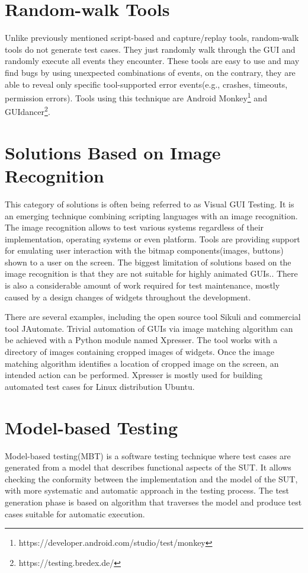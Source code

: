 \section{Random-walk Tools}
Unlike previously mentioned script-based and capture/replay tools, random-walk tools do not generate test cases. They just randomly walk through the GUI and randomly execute all events they encounter. These tools are easy to use and may find bugs by using unexpected combinations of events, on the contrary, they are able to reveal only specific tool-supported error events(e.g., crashes, timeouts, permission errors). Tools using this technique are Android Monkey\footnote{https://developer.android.com/studio/test/monkey} and GUIdancer\footnote{https://testing.bredex.de/}.

\section{Solutions Based on Image Recognition}
This category of solutions is often being referred to as Visual GUI Testing. It is an emerging technique combining scripting languages with an image recognition. The image recognition allows to test various systems regardless of their implementation, operating systems or even platform. Tools are providing support for emulating user interaction with the bitmap components(images, buttons) shown to a user on the screen. The biggest limitation of solutions based on the image recognition is that they are not suitable for highly animated GUIs.\cite{guitesting}. There is also a considerable amount of work required for test maintenance, mostly caused by a design changes of widgets throughout the development.   

There are several examples, including the open source tool Sikuli and commercial tool JAutomate. Trivial automation of GUIs via image matching algorithm can be achieved with a Python module named Xpresser. The tool works with a directory of images containing cropped images of widgets. Once the image matching algorithm identifies a location of cropped image on the screen, an intended action can be performed.\cite{xpresser} Xpresser is mostly used for building automated test cases for Linux distribution Ubuntu.

\section{Model-based Testing}
Model-based testing(MBT) is a software testing technique where test cases are generated from a model that describes functional aspects of the SUT. It allows checking the conformity between the implementation and the model of the SUT, with more systematic and automatic approach in the testing process. The test generation phase is based on algorithm that traverses the model and produce test cases suitable for automatic execution. 

